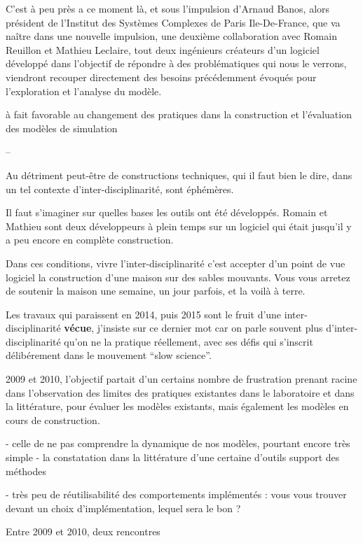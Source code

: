 C'est à peu près a ce moment là, et sous l'impulsion d'Arnaud Banos, alors président de l'Institut des Systèmes Complexes de Paris Ile-De-France, que va naître dans une nouvelle impulsion, une deuxième collaboration avec Romain Reuillon et Mathieu Leclaire, tout deux ingénieurs créateurs d'un logiciel développé dans l'objectif de répondre à des problématiques qui nous le verrons, viendront recouper directement des besoins précédemment évoqués pour l'exploration et l'analyse du modèle.


à fait favorable au changement des pratiques dans la construction et l'évaluation des modèles de simulation 


--

Au détriment peut-être de constructions techniques, qui il faut bien le dire, dans un tel contexte d'inter-disciplinarité, sont éphémères.

Il faut s'imaginer sur quelles bases les outils ont été développés. Romain et Mathieu sont deux développeurs à plein temps sur un logiciel qui était jusqu'il y a peu encore en complète construction.

Dans ces conditions, vivre l'inter-disciplinarité c'est accepter d'un point de vue logiciel la construction d'une maison sur des sables mouvants. Vous vous arretez de soutenir la maison une semaine, un jour parfois, et la voilà à terre.

Les travaux qui paraissent en 2014, puis 2015 sont le fruit d'une inter-disciplinarité \textbf{vécue}, j'insiste sur ce dernier mot car on parle souvent plus d'inter-disciplinarité qu'on ne la pratique réellement, avec ses défis \autocite{Chapron2014} qui s'inscrit délibérement dans le mouvement \enquote{slow science}.


 2009 et 2010, l'objectif partait d'un certains nombre de frustration prenant racine  dans l'observation des limites des pratiques existantes dans le laboratoire et dans la littérature, pour évaluer les modèles existants, mais également les modèles en cours de construction.

  - celle de ne pas comprendre la dynamique de nos modèles, pourtant encore très simple
  - la constatation dans la littérature d'une certaine d'outils support des méthodes

  - très peu de réutilisabilité des comportements implémentés : vous vous trouver devant un choix d'implémentation, lequel sera le bon ?


Entre 2009 et 2010, deux rencontres


